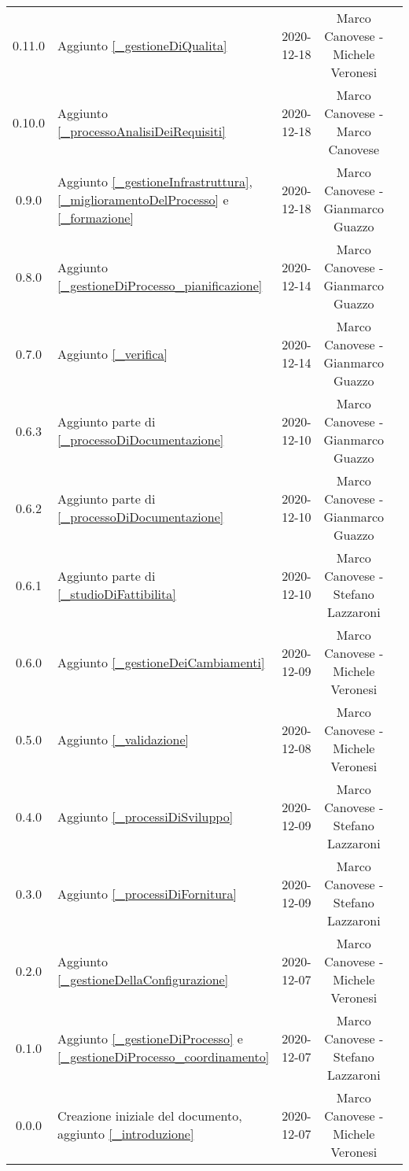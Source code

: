\begin{center}
\begin{longtable}{|c|p{5cm}|c|c|c|}
		0.11.0 & Aggiunto \ref{_gestioneDiQualita} & 2020-12-18 & Marco Canovese - Michele Veronesi \\
		0.10.0 & Aggiunto \ref{_processoAnalisiDeiRequisiti} & 2020-12-18 & Marco Canovese - Marco Canovese  \\
		0.9.0 & Aggiunto \ref{_gestioneInfrastruttura}, \ref{_miglioramentoDelProcesso} e \ref{_formazione} & 2020-12-18 & Marco Canovese - Gianmarco Guazzo  \\
		0.8.0 & Aggiunto \ref{_gestioneDiProcesso_pianificazione} & 2020-12-14 & Marco Canovese - Gianmarco Guazzo \\
		0.7.0 & Aggiunto \ref{_verifica} & 2020-12-14& Marco Canovese - Gianmarco Guazzo \\
		0.6.3 & Aggiunto parte di \ref{_processoDiDocumentazione} & 2020-12-10 & Marco Canovese - Gianmarco Guazzo \\
		0.6.2 & Aggiunto parte di \ref{_processoDiDocumentazione} & 2020-12-10 & Marco Canovese - Gianmarco Guazzo \\
		0.6.1 & Aggiunto parte di \ref{_studioDiFattibilita} & 2020-12-10 & Marco Canovese - Stefano Lazzaroni  \\
		0.6.0 & Aggiunto \ref{_gestioneDeiCambiamenti} & 2020-12-09 & Marco Canovese - Michele Veronesi \\
		0.5.0 & Aggiunto \ref{_validazione} & 2020-12-08 & Marco Canovese - Michele Veronesi  \\
		0.4.0 & Aggiunto \ref{_processiDiSviluppo} & 2020-12-09 & Marco Canovese - Stefano Lazzaroni  \\
		0.3.0 & Aggiunto \ref{_processiDiFornitura} & 2020-12-09 & Marco Canovese - Stefano Lazzaroni \\
		0.2.0 & Aggiunto \ref{_gestioneDellaConfigurazione} & 2020-12-07 & Marco Canovese - Michele Veronesi  \\
		0.1.0 & Aggiunto \ref{_gestioneDiProcesso} e \ref{_gestioneDiProcesso_coordinamento} & 2020-12-07 & Marco Canovese - Stefano Lazzaroni \\
		0.0.0 & Creazione iniziale del documento, aggiunto \ref{_introduzione} & 2020-12-07 & Marco Canovese - Michele Veronesi \\
		
		\hline
	\end{longtable}
\end{center}